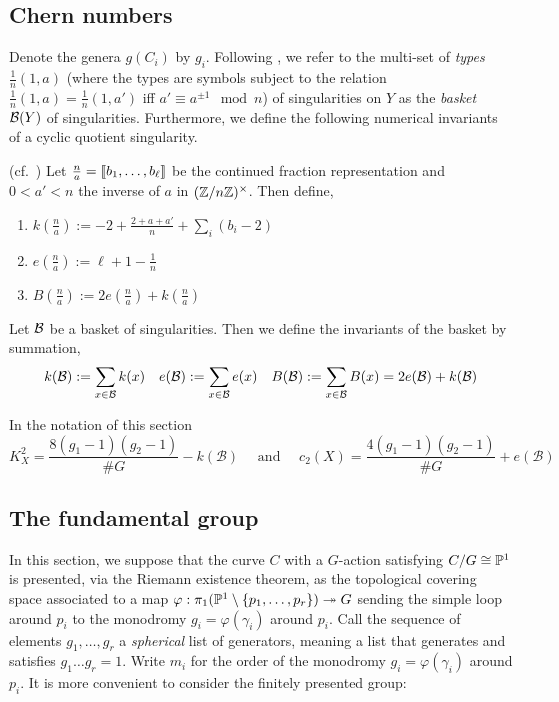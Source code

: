 \documentclass[main.tex]{subfiles}
\begin{document}
\subsection{Chern numbers}


Denote the genera $g(C_i)$ by $g_i$. Following \cite[\S1]{bauer:classification}, we refer to the multi-set of \textit{types} $\tfrac{1}{n} (1,a)$ (where the types are symbols subject to the relation $\tfrac{1}{n}(1, a) = \tfrac{1}{n}(1, a')$ iff $a' \equiv a^{\pm 1} \mod n$) of singularities on $Y$ as the \textit{basket} $\cB(Y)$ of singularities. Furthermore, we define the following numerical invariants of a cyclic quotient singularity.

\begin{defn} (cf.\ \cite[Definition~1.4]{bauer:classification})
Let $\frac{n}{a} = \dbrac{b_1, \dots, b_{\ell}}$ be the continued fraction representation and $0 < a' < n$ the inverse of $a$ in $(\Z / n \Z)^{\times}$. Then define,
\begin{enumerate}
    \item $k(\tfrac{n}{a}) := -2 + \frac{2 + a + a'}{n} + \sum_i (b_i - 2)$
    \item $e(\tfrac{n}{a}) := \ell + 1 - \frac{1}{n}$
    \item $B(\tfrac{n}{a}) := 2 e(\tfrac{n}{a}) + k(\tfrac{n}{a})$
\end{enumerate}
Let $\cB$ be a basket of singularities. Then we define the invariants of the basket by summation,
\[ k(\cB) := \sum_{x \in \cB} k(x) \quad e(\cB) := \sum_{x \in \cB} e(x) \quad B(\cB) := \sum_{x \in \cB} B(x) = 2 e(\cB) + k(\cB) \]
\end{defn}

\begin{prop} \cite[Proposition 1.5]{bauer:classification} \label{prop:chern_numerics}
In the notation of this section
\[ K_X^2 = \frac{8(g_1 - 1)(g_2 - 1)}{\# G} - k(\mathcal{B}) \quad \text{ and } \quad c_2(X) = \frac{4(g_1 - 1)(g_2 - 1)}{\# G} + e(\mathcal{B}) \]
\end{prop} 

\subsection{The fundamental group} \label{section:pi_1}

In this section, we suppose that the curve $C$ with a $G$-action satisfying $C / G \cong \P^1$ is presented, via the Riemann existence theorem, as the topological covering space associated to a map $\varphi : \pi_1(\P^1 \sm \{ p_1, \dots, p_r \}) \onto G$ sending the simple loop around $p_i$ to the monodromy $g_i = \varphi(\gamma_i)$ around $p_i$. Call the sequence of elements $g_1, \dots, g_r$ a \textit{spherical} list of generators, meaning a list that generates and satisfies $g_1 \dots g_r = 1$. Write $m_i$ for the order of the monodromy $g_i = \varphi(\gamma_i)$ around $p_i$. It is more convenient to consider the finitely presented group:
\end{document}
